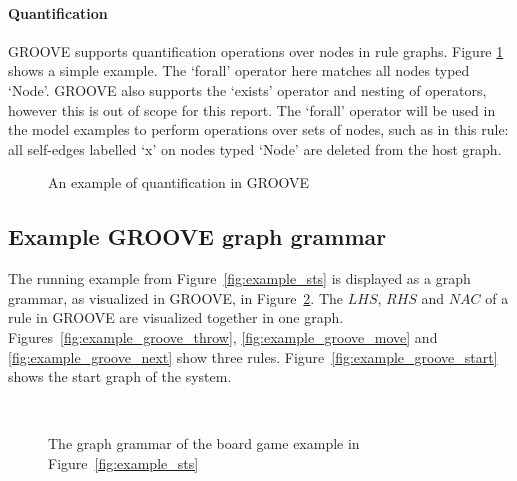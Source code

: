 \paragraph*{Quantification}
GROOVE supports quantification operations over nodes in rule graphs. Figure \ref{fig:quantification} shows a simple example. The `forall' operator here matches all nodes typed `Node'. GROOVE also supports the `exists' operator and nesting of operators, however this is out of scope for this report. The `forall' operator will be used in the model examples to perform operations over sets of nodes, such as in this rule: all self-edges labelled `x' on nodes typed `Node' are deleted from the host graph. 

\begin{figure}[h]
  \begin{center}
    
  \end{center}
  \caption{An example of quantification in GROOVE}
  \label{fig:quantification}
\end{figure}

\subsection{Example GROOVE graph grammar}\label{sec:example_groove} 
The running example from Figure~\ref{fig:example_sts} is displayed as a graph grammar, as visualized in GROOVE, in Figure~\ref{fig:example_groove}. The $\mathit{LHS}$, $\mathit{RHS}$ and $\mathit{NAC}$ of a rule in GROOVE are visualized together in one graph. Figures~\ref{fig:example_groove_throw}, \ref{fig:example_groove_move} and \ref{fig:example_groove_next} show three rules. Figure~\ref{fig:example_groove_start} shows the start graph of the system.

\begin{figure}[h]
  \begin{center}
    \quad \\
    \hspace{10px}
    \hspace{10px}
  \end{center}
  \caption{The graph grammar of the board game example in Figure~\ref{fig:example_sts}}
  \label{fig:example_groove}
\end{figure}

